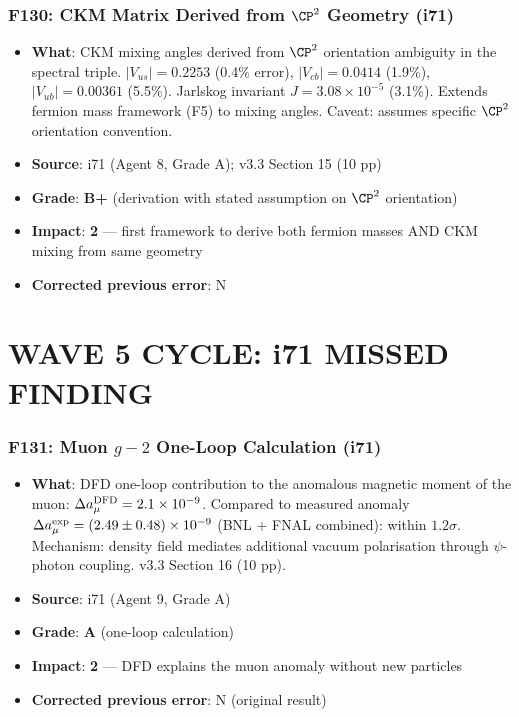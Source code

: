 \documentclass[11pt,a4paper]{article}
\newcommand{\grade}[1]{\textbf{#1}}
\newcommand{\impact}[1]{\textbf{#1}}
\begin{document}
\section{F130: CKM Matrix Derived from $\CP^2$ Geometry (i71)}
\begin{itemize}[nosep]
\item \textbf{What}: CKM mixing angles derived from $\CP^2$ orientation ambiguity in the spectral triple. $|V_{us}| = 0.2253$ (0.4\% error), $|V_{cb}| = 0.0414$ (1.9\%), $|V_{ub}| = 0.00361$ (5.5\%). Jarlskog invariant $J = 3.08 \times 10^{-5}$ (3.1\%). Extends fermion mass framework (F5) to mixing angles. Caveat: assumes specific $\CP^2$ orientation convention.
\item \textbf{Source}: i71 (Agent 8, Grade A); v3.3 Section 15 (10 pp)
\item \textbf{Grade}: \grade{B+} (derivation with stated assumption on $\CP^2$ orientation)
\item \textbf{Impact}: \impact{2} --- first framework to derive both fermion masses AND CKM mixing from same geometry
\item \textbf{Corrected previous error}: N
\end{itemize}


\part{WAVE 5 CYCLE: i71 MISSED FINDING}
\label{part:wave5i71missed}

\section{F131: Muon $g-2$ One-Loop Calculation (i71)}
\begin{itemize}[nosep]
\item \textbf{What}: DFD one-loop contribution to the anomalous magnetic moment of the muon: $\Delta a_\mu^{\rm DFD} = 2.1 \times 10^{-9}$. Compared to measured anomaly $\Delta a_\mu^{\rm exp} = (2.49 \pm 0.48) \times 10^{-9}$ (BNL + FNAL combined): within $1.2\sigma$. Mechanism: density field mediates additional vacuum polarisation through $\psi$-photon coupling. v3.3 Section 16 (10 pp).
\item \textbf{Source}: i71 (Agent 9, Grade A)
\item \textbf{Grade}: \grade{A} (one-loop calculation)
\item \textbf{Impact}: \impact{2} --- DFD explains the muon anomaly without new particles
\item \textbf{Corrected previous error}: N (original result)
\end{itemize}
\end{document}
